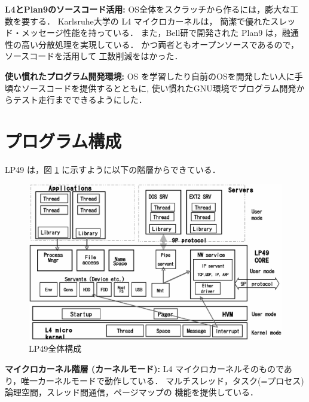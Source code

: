\documentclass{ieicej}
\begin{document}
{\bf L4\cite{L4}とPlan9\cite{plan9}のソースコード活用:}   
    OS全体をスクラッチから作るには，膨大な工数を要する．
    Karlsruhe大学の L4 マイクロカーネルは， 
    簡潔で優れたスレッド・メッセージ性能を持っている．
    また，Bell研で開発された Plan9 は，融通性の高い分散処理を実現している．
    かつ両者ともオープンソースであるので，ソースコードを活用して
    工数削減をはかった．
    
{\bf 使い慣れたプログラム開発環境:} 
      OS を学習したり自前のOSを開発したい人に手頃なソースコードを提供するとともに, 
  使い慣れたGNU環境でプログラム開発からテスト走行までできるようにした．



\section{プログラム構成}

      LP49 は，図 \ref{fig:LP49general} に示すように以下の階層からできている．

\begin{figure}[tb]
  \begin{center}
   \includegraphics[width=130mm]{../fig/LP49general.eps}
    \caption{LP49全体構成}
    \label{fig:LP49general}
  \end{center}
\end{figure}


{\bf マイクロカーネル階層  (カーネルモード): }
     L4 マイクロカーネルそのものであり，唯一カーネルモードで動作している．
     マルチスレッド，タスク(=プロセス)論理空間，スレッド間通信，ページマップの
     機能を提供している．
    
\end{document}
